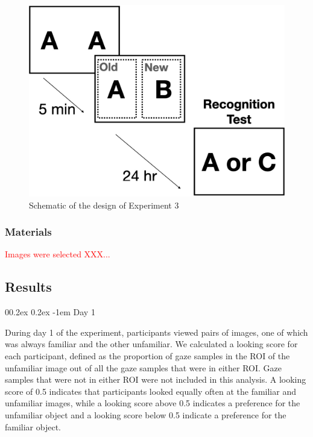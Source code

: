 \documentclass[
  man,floatsintext]{apa6}
\makeatletter
\let\oldparagraph\paragraph
\renewcommand{\paragraph}[1]{\oldparagraph{#1}\mbox{}}
\renewcommand{\paragraph}{\@startsection{paragraph}{4}{\parindent}%
  {0\baselineskip \@plus 0.2ex \@minus 0.2ex}%
  {-1em}%
  {\normalfont\normalsize\bfseries\itshape\typesectitle}}
\makeatother
\begin{document}
\begin{figure}
\centering
\includegraphics{group-c/E3-example-figure.jpeg}
\caption{\label{fig:E3-design-schematic}Schematic of the design of Experiment 3}
\end{figure}

\subsubsection{Materials}\label{materials}

\textcolor{red}{Images were selected XXX...}

\subsection{Results}\label{results-2}

\paragraph{Day 1}\label{day-1}

During day 1 of the experiment, participants viewed pairs of images, one of which was always familiar and the other unfamiliar. We calculated a looking score for each participant, defined as the proportion of gaze samples in the ROI of the unfamiliar image out of all the gaze samples that were in either ROI. Gaze samples that were not in either ROI were not included in this analysis. A looking score of 0.5 indicates that participants looked equally often at the familiar and unfamiliar images, while a looking score above 0.5 indicates a preference for the unfamiliar object and a looking score below 0.5 indicate a preference for the familiar object.
\end{document}
